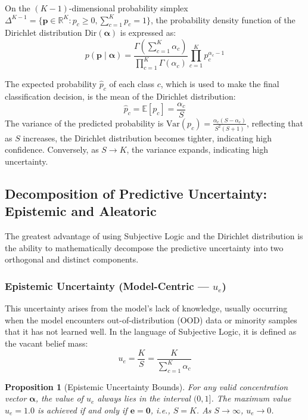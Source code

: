 \documentclass[11pt, a4paper]{article}
\newcommand{\Dir}{\text{Dir}}
\newcommand{\R}{\mathbb{R}}
\newcommand{\E}{\mathbb{E}}
\newtheorem{proposition}{Proposition}
\begin{document}
On the $(K{-}1)$-dimensional probability simplex $\Delta^{K-1} = \{\bm{p} \in \R^K : p_c \ge 0, \sum_{c=1}^K p_c = 1\}$, the probability density function of the Dirichlet distribution $\Dir(\bm{\alpha})$ is expressed as:
\begin{equation}\label{eq:dirichlet_pdf}
    p(\bm{p} \mid \bm{\alpha}) = \frac{\Gamma\!\left(\sum_{c=1}^K \alpha_c\right)}{\prod_{c=1}^K \Gamma(\alpha_c)} \prod_{c=1}^K p_c^{\alpha_c - 1}
\end{equation}

The expected probability $\hat{p}_c$ of each class $c$, which is used to make the final classification decision, is the mean of the Dirichlet distribution:
\begin{equation}\label{eq:p_hat}
    \hat{p}_c = \E[p_c] = \frac{\alpha_c}{S}
\end{equation}
The variance of the predicted probability is $\text{Var}(p_c) = \frac{\alpha_c(S - \alpha_c)}{S^2(S + 1)}$, reflecting that as $S$ increases, the Dirichlet distribution becomes tighter, indicating high confidence. Conversely, as $S \to K$, the variance expands, indicating high uncertainty.

\subsection{Decomposition of Predictive Uncertainty: Epistemic and Aleatoric}\label{subsec:uncertainties}

The greatest advantage of using Subjective Logic and the Dirichlet distribution is the ability to mathematically decompose the predictive uncertainty into two orthogonal and distinct components.

\subsubsection{Epistemic Uncertainty (Model-Centric --- $u_e$)}

This uncertainty arises from the model's lack of knowledge, usually occurring when the model encounters out-of-distribution (OOD) data or minority samples that it has not learned well. In the language of Subjective Logic, it is defined as the vacant belief mass:
\begin{equation}\label{eq:u_e}
    u_e = \frac{K}{S} = \frac{K}{\sum_{c=1}^K \alpha_c}
\end{equation}

\begin{proposition}[Epistemic Uncertainty Bounds]
For any valid concentration vector $\bm{\alpha}$, the value of $u_e$ always lies in the interval $(0, 1]$. The maximum value $u_e = 1.0$ is achieved if and only if $\bm{e} = \bm{0}$, i.e., $S = K$. As $S \to \infty$, $u_e \to 0$.
\end{proposition}
\end{document}
